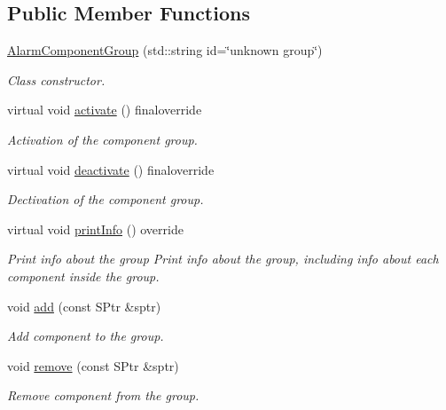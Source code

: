 \subsection*{Public Member Functions}
\begin{DoxyCompactItemize}
\item 
\hyperlink{classAlarmComponentGroup_af999ab1dac77f573df01fb400ec5d044}{Alarm\+Component\+Group} (std\+::string id=\char`\"{}unknown group\char`\"{})
\begin{DoxyCompactList}\small\item\em Class constructor. \end{DoxyCompactList}\item 
virtual void \hyperlink{classAlarmComponentGroup_ac67076993e9068dc15e8d39af29698a4}{activate} () finaloverride
\begin{DoxyCompactList}\small\item\em Activation of the component group. \end{DoxyCompactList}\item 
virtual void \hyperlink{classAlarmComponentGroup_a673cebdc7e32c522af0e7435786ea118}{deactivate} () finaloverride
\begin{DoxyCompactList}\small\item\em Dectivation of the component group. \end{DoxyCompactList}\item 
virtual void \hyperlink{classAlarmComponentGroup_a07b07cb3f5b41360e3aaf83b9d0938b1}{print\+Info} () override\hypertarget{classAlarmComponentGroup_a07b07cb3f5b41360e3aaf83b9d0938b1}{}\label{classAlarmComponentGroup_a07b07cb3f5b41360e3aaf83b9d0938b1}

\begin{DoxyCompactList}\small\item\em Print info about the group Print info about the group, including info about each component inside the group. \end{DoxyCompactList}\item 
void \hyperlink{classAlarmComponentGroup_a8e6775dd15144e3a09396cfd5592779c}{add} (const S\+Ptr \&sptr)
\begin{DoxyCompactList}\small\item\em Add component to the group. \end{DoxyCompactList}\item 
void \hyperlink{classAlarmComponentGroup_a39378037a74da6477fb01f2965fe67da}{remove} (const S\+Ptr \&sptr)
\begin{DoxyCompactList}\small\item\em Remove component from the group. \end{DoxyCompactList}\end{DoxyCompactItemize}
